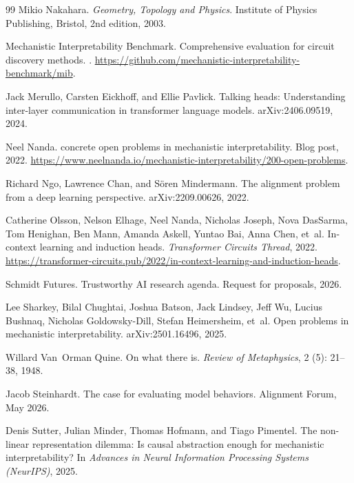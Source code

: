 \documentclass{article}
\begin{document}
\begin{thebibliography}{99}
Mikio Nakahara.
\newblock \emph{Geometry, Topology and Physics}.
\newblock Institute of Physics Publishing, Bristol, 2nd edition, 2003.

Mechanistic Interpretability Benchmark.
\newblock Comprehensive evaluation for circuit discovery methods.
.
\newblock \url{https://github.com/mechanistic-interpretability-benchmark/mib}.

Jack Merullo, Carsten Eickhoff, and Ellie Pavlick.
\newblock Talking heads: Understanding inter-layer communication in transformer
  language models.
\newblock arXiv:2406.09519, 2024.

Neel Nanda.
 concrete open problems in mechanistic interpretability.
\newblock Blog post, 2022.
\newblock \url{https://www.neelnanda.io/mechanistic-interpretability/200-open-problems}.

Richard Ngo, Lawrence Chan, and S\"oren Mindermann.
\newblock The alignment problem from a deep learning perspective.
\newblock arXiv:2209.00626, 2022.

Catherine Olsson, Nelson Elhage, Neel Nanda, Nicholas Joseph, Nova DasSarma,
  Tom Henighan, Ben Mann, Amanda Askell, Yuntao Bai, Anna Chen, et~al.
\newblock In-context learning and induction heads.
\newblock \emph{Transformer Circuits Thread}, 2022.
\newblock \url{https://transformer-circuits.pub/2022/in-context-learning-and-induction-heads}.

Schmidt Futures.
\newblock Trustworthy AI research agenda.
\newblock Request for proposals, 2026.

Lee Sharkey, Bilal Chughtai, Joshua Batson, Jack Lindsey, Jeff Wu, Lucius
  Bushnaq, Nicholas Goldowsky-Dill, Stefan Heimersheim, et~al.
\newblock Open problems in mechanistic interpretability.
\newblock arXiv:2501.16496, 2025.

Willard Van~Orman Quine.
\newblock On what there is.
\newblock \emph{Review of Metaphysics}, 2 (5): 21--38, 1948.

Jacob Steinhardt.
\newblock The case for evaluating model behaviors.
\newblock Alignment Forum, May 2026.

Denis Sutter, Julian Minder, Thomas Hofmann, and Tiago Pimentel.
\newblock The non-linear representation dilemma: Is causal abstraction enough
  for mechanistic interpretability?
\newblock In \emph{Advances in Neural Information Processing Systems
  (NeurIPS)}, 2025.


\end{thebibliography}
\end{document}
